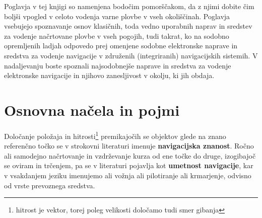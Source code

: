 \begin{figure}
	\label{fig:SoncniKompas}       %
\end{figure}



Poglavja v tej knjigi so namenjena bodočim pomorščakom, da z njimi dobite čim boljši vpogled v celoto vodenja varne plovbe v vseh okoliščinah. Poglavja vsebujejo spoznavanje osnov klasičnih, toda vedno uporabnih naprav in sredstev za vodenje načrtovane plovbe v vseh pogojih, tudi takrat, ko na sodobno opremljenih ladjah odpovedo prej omenjene sodobne elektronske naprave in sredstva za vodenje navigacije v združenih (integriranih) navigacijskih sistemih. V nadaljevanju boste spoznali najsodobnejše naprave in sredstva za vodenje elektronske navigacije in njihovo zanesljivost v okolju, ki jih obdaja.


\section{Osnovna načela in pojmi}
\label{sec:OsnNacela}

Določanje položaja in hitrosti\footnote{hitrost je vektor, torej poleg velikosti določamo tudi smer gibanja} premikajočih se objektov glede na znano referenčno točko se v strokovni literaturi imenuje \textbf{navigacijska znanost}. Ročno ali samodejno načrtovanje in vzdrževanje kurza od ene točke do druge, izogibajoč se oviram in trčenjem, pa se v literaturi pojavlja kot \textbf{umetnost navigacije}, kar v vsakdanjem jeziku imenujemo ali vožnja ali pilotiranje ali krmarjenje, odvisno od vrste prevoznega sredstva. 

